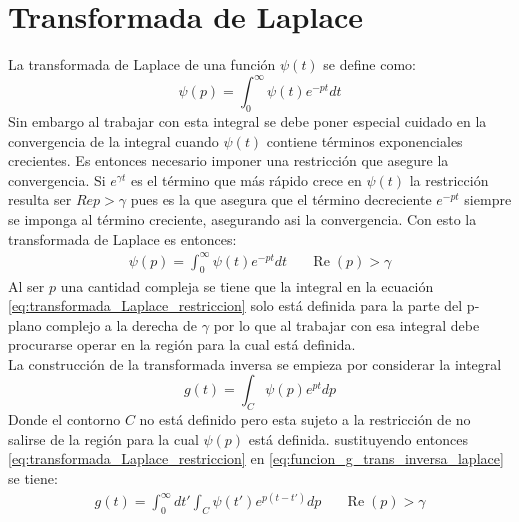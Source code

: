 \documentclass[../tesis_main_file.tex]{subfiles}
\begin{document}
\onlyinsubfile{\appendix}
\onlyinsubfile{\setcounter{chapter}{1}}
\section{Transformada de Laplace}\label{Ap:Laplace}
La transformada de Laplace de una función $\psi (t)$ se define como:
\begin{equation}
\label{eq:def_transformada_Laplace}
\psi (p) = \int^{\infty}_0 \psi (t) e^{-pt}dt
\end{equation}
Sin embargo al trabajar con esta integral se debe poner especial cuidado en la convergencia de la integral cuando $\psi (t)$ contiene términos exponenciales crecientes.
Es entonces necesario imponer una restricción que asegure la convergencia. Si $e^{\gamma t}$ es el término que más rápido crece en $\psi (t)$ la restricción resulta ser $Re p > \gamma$ pues es la que asegura que el término decreciente $e ^{-pt}$ siempre se imponga al término creciente, asegurando asi la convergencia. Con esto la transformada de Laplace es entonces:
\begin{align}
\label{eq:transformada_Laplace_restriccion}
\psi (p) = \int^{\infty}_0 \psi (t) e^{-pt}dt && \operatorname{Re}(p) > \gamma
\end{align}
Al ser $p$ una cantidad compleja se tiene que la integral en la ecuación \ref{eq:transformada_Laplace_restriccion} solo está definida para la parte del p-plano complejo a la derecha de $\gamma$ por lo que al trabajar con esa integral debe procurarse operar en la región para la cual está definida.\\
La construcción de la transformada inversa se empieza por considerar la integral
\begin{equation}
\label{eq:funcion_g_trans_inversa_laplace}
g(t) = \int _C \psi(p)e^{pt}dp
\end{equation}
Donde el contorno $C$ no está definido pero esta sujeto a la restricción de no salirse de la región para la cual $\psi (p)$ está definida. sustituyendo entonces \ref{eq:transformada_Laplace_restriccion} en \ref{eq:funcion_g_trans_inversa_laplace} se tiene:
\begin{align}
\label{eq:funcion_g_sustitucion}
g(t) = \int ^{\infty}_0dt'\int _C \psi (t')e^{p(t-t')}dp & & \operatorname{Re}(p) > \gamma
\end{align}
\end{document}
